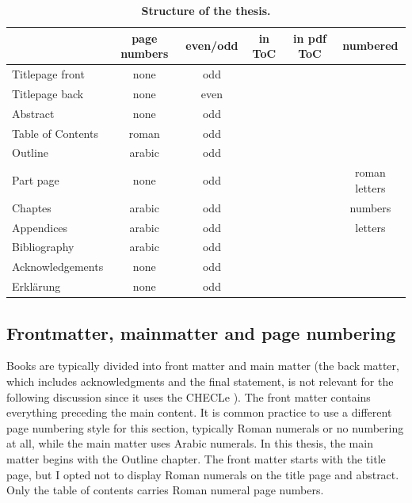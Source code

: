 \begin{table}
	\centering 
	\caption{\textbf{Structure of the thesis.}}
	\label{tab:thesistructure}
	\vspace{5ex}
	\begin{tabular}{lccccc} 
		\toprule
		 & page numbers & even/odd & in ToC & in pdf ToC & numbered  \\ 
		\midrule 
		Titlepage front  & none & odd & \color{bqred}\XSolidBrush& \color{bqgreen} \CheckmarkBold &\color{bqred} \XSolidBrush\\
		Titlepage back & none & even & \color{bqred}\XSolidBrush& \color{bqred}\XSolidBrush& \color{bqred}\XSolidBrush\\
		Abstract & none & odd & \color{bqred}\XSolidBrush& \color{bqgreen}\CheckmarkBold & \color{bqred}\XSolidBrush\\
		Table of Contents & roman & odd & \color{bqred}\XSolidBrush& \color{bqgreen}\CheckmarkBold &\color{bqred} \XSolidBrush\\
		Outline & arabic & odd &\color{bqgreen} \CheckmarkBold &\color{bqgreen} \CheckmarkBold & \color{bqred}\XSolidBrush\\
		Part page & none & odd & \color{bqgreen}\CheckmarkBold & \color{bqgreen}\CheckmarkBold & roman letters\\
		Chaptes & arabic & odd & \color{bqgreen}\CheckmarkBold &\color{bqgreen} \CheckmarkBold & numbers\\
		Appendices & arabic & odd & \color{bqgreen}\CheckmarkBold &\color{bqgreen} \CheckmarkBold & letters\\
		Bibliography & arabic & odd & \color{bqgreen}\CheckmarkBold & \color{bqgreen}\CheckmarkBold & \color{bqred}\XSolidBrush\\
		Acknowledgements & none & odd & \color{bqred}\XSolidBrush& \color{bqgreen}\CheckmarkBold & \color{bqred}\XSolidBrush\\
		Erklärung & none & odd & \color{bqred}\XSolidBrush&\color{bqgreen} \CheckmarkBold & \color{bqred}\XSolidBrush\\
		\bottomrule
	\end{tabular}
\end{table}


\subsection{Frontmatter, mainmatter and page numbering}
Books are typically divided into front matter and main matter (the back matter, which includes acknowledgments and the final statement, is not relevant for the following discussion since it uses the CHECLe
). The front matter contains everything preceding the main content. It is common practice to use a different page numbering style for this section, typically Roman numerals or no numbering at all, while the main matter uses Arabic numerals.
In this thesis, the main matter begins with the Outline chapter. The front matter starts with the title page, but I opted not to display Roman numerals on the title page and abstract. Only the table of contents carries Roman numeral page numbers.


